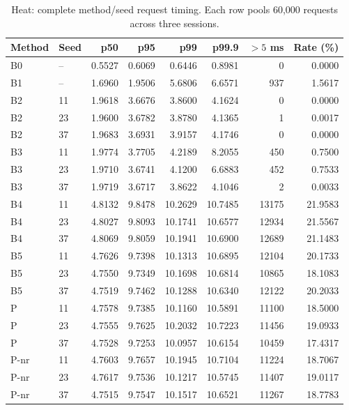 \begin{table}[ht]
\centering\small
\caption{Heat: complete method/seed request timing. Each row pools 60,000 requests across three sessions.}
\begin{tabular}{@{}llrrrrrr@{}}\toprule
Method & Seed & p50 & p95 & p99 & p99.9 & $>5$ ms & Rate (\%)\\\midrule
B0 & -- & 0.5527 & 0.6069 & 0.6446 & 0.8981 & 0 & 0.0000\\
B1 & -- & 1.6960 & 1.9506 & 5.6806 & 6.6571 & 937 & 1.5617\\
B2 & 11 & 1.9618 & 3.6676 & 3.8600 & 4.1624 & 0 & 0.0000\\
B2 & 23 & 1.9600 & 3.6782 & 3.8780 & 4.1365 & 1 & 0.0017\\
B2 & 37 & 1.9683 & 3.6931 & 3.9157 & 4.1746 & 0 & 0.0000\\
B3 & 11 & 1.9774 & 3.7705 & 4.2189 & 8.2055 & 450 & 0.7500\\
B3 & 23 & 1.9710 & 3.6741 & 4.1200 & 6.6883 & 452 & 0.7533\\
B3 & 37 & 1.9719 & 3.6717 & 3.8622 & 4.1046 & 2 & 0.0033\\
B4 & 11 & 4.8132 & 9.8478 & 10.2629 & 10.7485 & 13175 & 21.9583\\
B4 & 23 & 4.8027 & 9.8093 & 10.1741 & 10.6577 & 12934 & 21.5567\\
B4 & 37 & 4.8069 & 9.8059 & 10.1941 & 10.6900 & 12689 & 21.1483\\
B5 & 11 & 4.7626 & 9.7398 & 10.1313 & 10.6895 & 12104 & 20.1733\\
B5 & 23 & 4.7550 & 9.7349 & 10.1698 & 10.6814 & 10865 & 18.1083\\
B5 & 37 & 4.7519 & 9.7462 & 10.1288 & 10.6340 & 12122 & 20.2033\\
P & 11 & 4.7578 & 9.7385 & 10.1160 & 10.5891 & 11100 & 18.5000\\
P & 23 & 4.7555 & 9.7625 & 10.2032 & 10.7223 & 11456 & 19.0933\\
P & 37 & 4.7528 & 9.7253 & 10.0957 & 10.6154 & 10459 & 17.4317\\
P-nr & 11 & 4.7603 & 9.7657 & 10.1945 & 10.7104 & 11224 & 18.7067\\
P-nr & 23 & 4.7617 & 9.7536 & 10.1217 & 10.5745 & 11407 & 19.0117\\
P-nr & 37 & 4.7515 & 9.7547 & 10.1517 & 10.6521 & 11267 & 18.7783\\
\bottomrule\end{tabular}
\end{table}
